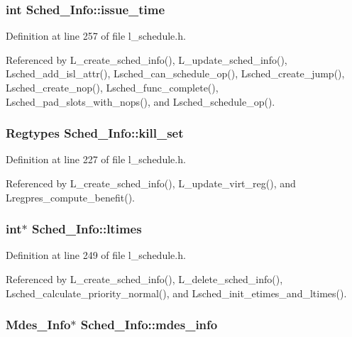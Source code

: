 \subsubsection{\setlength{\rightskip}{0pt plus 5cm}int \bf{Sched\_\-Info::issue\_\-time}}\label{structSched__Info_dcf1af1cd102ca766bb1b1bbac96a997}




Definition at line 257 of file l\_\-schedule.h.

Referenced by L\_\-create\_\-sched\_\-info(), L\_\-update\_\-sched\_\-info(), Lsched\_\-add\_\-isl\_\-attr(), Lsched\_\-can\_\-schedule\_\-op(), Lsched\_\-create\_\-jump(), Lsched\_\-create\_\-nop(), Lsched\_\-func\_\-complete(), Lsched\_\-pad\_\-slots\_\-with\_\-nops(), and Lsched\_\-schedule\_\-op().
\subsubsection{\setlength{\rightskip}{0pt plus 5cm}\bf{Regtypes} \bf{Sched\_\-Info::kill\_\-set}}\label{structSched__Info_ca8d2d104f24563407a59e7d77bbd7b4}




Definition at line 227 of file l\_\-schedule.h.

Referenced by L\_\-create\_\-sched\_\-info(), L\_\-update\_\-virt\_\-reg(), and Lregpres\_\-compute\_\-benefit().
\subsubsection{\setlength{\rightskip}{0pt plus 5cm}int$\ast$ \bf{Sched\_\-Info::ltimes}}\label{structSched__Info_e544f054abafd1921f4e685c53cc41a6}




Definition at line 249 of file l\_\-schedule.h.

Referenced by L\_\-create\_\-sched\_\-info(), L\_\-delete\_\-sched\_\-info(), Lsched\_\-calculate\_\-priority\_\-normal(), and Lsched\_\-init\_\-etimes\_\-and\_\-ltimes().
\subsubsection{\setlength{\rightskip}{0pt plus 5cm}Mdes\_\-Info$\ast$ \bf{Sched\_\-Info::mdes\_\-info}}\label{structSched__Info_19d71a45986dbd38e365a5fe46f9bfb8}




